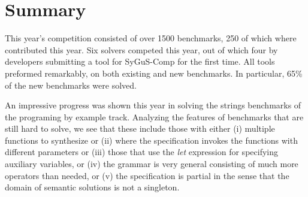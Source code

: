 \documentclass[submission,copyright,creativecommons]{eptcs}
\begin{document}


\label{sec:results}


\section{Summary}
\label{sec:discussion}
This year's competition consisted of over 1500 benchmarks, 250 of which where contributed this year. Six solvers competed this year, out of which four by developers submitting a tool for SyGuS-Comp for the first time. All tools preformed remarkably, on both existing and new benchmarks. In particular, 65\% of the new benchmarks were solved.

An impressive progress was shown this year in solving the strings benchmarks of the programing by example track. Analyzing the features of benchmarks that are still hard to solve, we see that these include those with either (i) multiple functions to synthesize or (ii) where the specification invokes the functions with different parameters or (iii) those that use the \emph{let} expression for specifying auxiliary variables, or (iv) the grammar is very general consisting of much more operators than needed, or (v) the specification is partial in the sense that the domain of semantic solutions is not a singleton.





\end{document}
